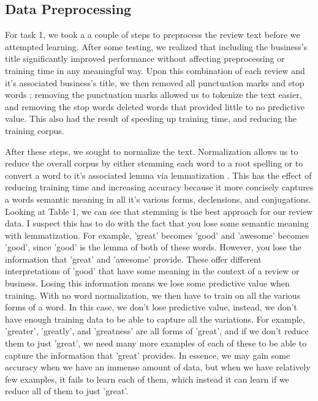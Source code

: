 \documentclass{article}
\begin{document}
\subsection*{Data Preprocessing}

For task 1, we took a a couple of steps to preprocess the review text before we attempted learning. After some testing, we realized that including the business's title significantly improved performance without affecting preprocessing or training time in any meaningful way. Upon this combination of each review and it's associated business's title, we then removed all punctuation marks and stop words \cite{wiki:stopwords}; removing the punctuation marks allowed us to tokenize the text easier, and removing the stop words deleted words that provided little to no predictive value. This also had the result of speeding up training time, and reducing the training corpus. 

After these steps, we sought to normalize the text. Normalization allows us to reduce the overall corpus by either stemming \cite{wiki:stem} each word to a root spelling or to convert a word to it's associated lemma via lemmatization \cite{wiki:lemma}. This has the effect of reducing training time and increasing accuracy because it more concisely captures a words semantic meaning in all it's various forms, declensions, and conjugations. Looking at Table 1, we can see that stemming is the best approach for our review data. I suspect this has to do with the fact that you lose some semantic meaning with lemmatization. For example, 'great' becomes 'good' and 'awesome' becomes 'good', since 'good' is the lemma of both of these words. However, you lose the information that 'great' and 'awesome' provide. These offer different interpretations of 'good' that have some meaning in the context of a review or business. Losing this information means we lose some predictive value when training. With no word normalization, we then have to train on all the various forms of a word. In this case, we don't lose predictive value, instead, we don't have enough training data to be able to capture all the variations. For example, 'greater', 'greatly', and 'greatness' are all forms of 'great', and if we don't reduce them to just 'great', we need many more examples of each of these to be able to capture the information that 'great' provides. In essence, we may gain some accuracy when we have an immense amount of data, but when we have relatively few examples, it fails to learn each of them, which instead it can learn if we reduce all of them to just 'great'. 
\end{document}
